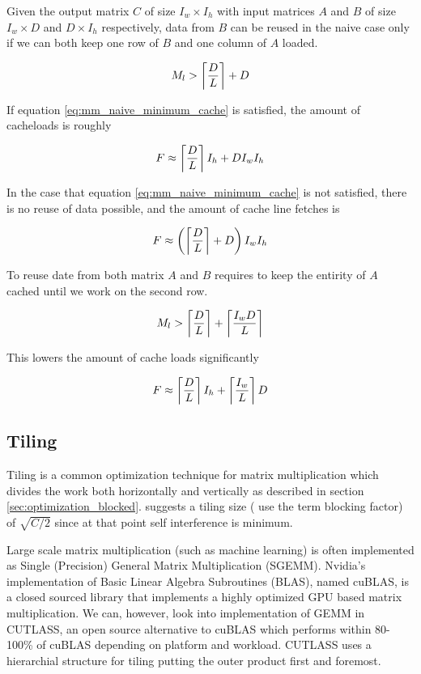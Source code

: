 Given the output matrix $C$ of size $I_w \times I_h$ with input matrices $A$ and $B$ of size $I_w \times D$ and $D \times I_h$ respectively, data from $B$ can be reused in the naive case only if we can both keep one row of $B$ and one column of $A$ loaded.

\begin{equation}
    \label{eq:mm_naive_minimum_cache}
    M_l > \left\lceil \frac{D}{L} \right\rceil + D
\end{equation}

\noindent
If equation \ref{eq:mm_naive_minimum_cache} is satisfied, the amount of cacheloads is roughly

\begin{equation}
    F \approx \left\lceil \frac{D}{L} \right\rceil I_h + D I_w I_h
\end{equation}

\noindent
In the case that equation \ref{eq:mm_naive_minimum_cache} is not satisfied, there is no reuse of data possible, and the amount of cache line fetches is

\begin{equation}
    F \approx \left( \left\lceil \frac{D}{L} \right\rceil + D \right) I_w I_h
\end{equation}

\noindent
To reuse date from both matrix $A$ and $B$ requires to keep the entirity of $A$ cached until we work on the second row.

\begin{equation}
    M_l > \left\lceil \frac{D}{L} \right\rceil + \left\lceil \frac{I_w D}{L} \right\rceil
\end{equation}

\noindent
This lowers the amount of cache loads significantly

\begin{equation}
    F \approx \left\lceil \frac{D}{L} \right\rceil I_h + \left\lceil \frac{I_w}{L} \right\rceil D
\end{equation}

\subsection{Tiling}
Tiling is a common optimization technique for matrix multiplication which divides the work both horizontally and vertically as described in section \ref{sec:optimization_blocked}.
\citet{lam1991cache} suggests a tiling size (\citeauthor{lam1991cache} use the term blocking factor) of $\sqrt{C/2}$ since at that point self interference is minimum.

Large scale matrix multiplication (such as machine learning) is often implemented as Single (Precision) General Matrix Multiplication (SGEMM). Nvidia's implementation of Basic Linear Algebra Subroutines (BLAS), named cuBLAS, is a closed sourced library that implements a highly optimized GPU based matrix multiplication.
We can, however, look into implementation of GEMM in CUTLASS, an open source alternative to cuBLAS which performs within 80-100\% of cuBLAS depending on platform and workload.
CUTLASS uses a hierarchial structure for tiling putting the outer product first and foremost.